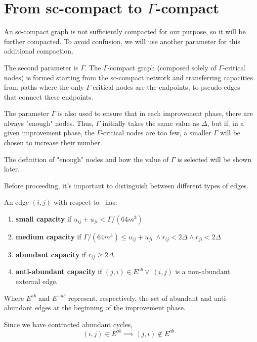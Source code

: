 \section{From sc-compact to $\Gamma$-compact}
An sc-compact graph is not sufficiently compacted for our purpose, so it will be further compacted. To avoid confusion, we will use another parameter for this additional compaction.

The second parameter is \(\Gamma\).  
The \(\Gamma\)-compact graph (composed solely of \(\Gamma\)-critical nodes) is formed starting from the sc-compact network and transferring capacities from paths where the only \(\Gamma\)-critical nodes are the endpoints, to pseudo-edges that connect these endpoints.

The parameter \(\Gamma\) is also used to ensure that in each improvement phase, there are always "enough" nodes. Thus, \(\Gamma\) initially takes the same value as \(\Delta\), but if, in a given improvement phase, the \(\Gamma\)-critical nodes are too few, a smaller \(\Gamma\) will be chosen to increase their number.

The definition of "enough" nodes and how the value of \(\Gamma\) is selected will be shown later.

Before proceeding, it’s important to distinguish between different types of edges.
\begin{definition}
    An edge $(i,j)$ with respect to \gmm\ has:
    \begin{enumerate}
        \item \textbf{small capacity} if $u_{ij}+u_{ji} < \Gamma/(64m^3)$
        \item \label{media}\textbf{medium capacity} if $\Gamma/(64m^3) \le u_{ij}+u_{ji}\ \land r_{ij} < 2\Delta \land r_{ji} < 2\Delta $
        \item \textbf{abundant capacity} if $r_{ij} \ge 2\Delta$ 
        \item \textbf{anti-abundant capacity} if $(j,i) \in E^{ab} \lor\ (i,j)$ is a non-abundant external edge.
    \end{enumerate}
    Where $E^{ab}$ and $E^{-ab}$ represent, respectively, the set of abundant and anti-abundant edges at the beginning of the improvement phase.

   
    
\end{definition}
\begin{obs}
    Since we have contracted abundant cycles, \[(i,j)\in E^{ab}\implies (j,i)\not \in E^{ab}\]
\end{obs}



